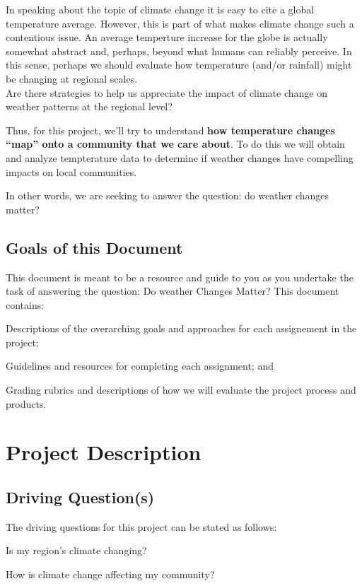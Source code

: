 \documentclass{article}\usepackage[]{graphicx}\usepackage[]{color}
\newenvironment{itemize*}%
  {\begin{itemize}%
    \setlength{\itemsep}{0pt}%
    \setlength{\parskip}{0pt}}%
  {\end{itemize}}
\newenvironment{enumerate*}%
  {\begin{enumerate}%
    \setlength{\itemsep}{0pt}%
    \setlength{\parskip}{0pt}}%
  {\end{enumerate}}
\begin{document}
In speaking about the topic of climate change it is easy to cite a global temperature average. However, this is part of what makes climate change such a contentious issue. An average temperture increase for the globe is actually somewhat abstract and, perhaps, beyond what humans can reliably perceive. In this sense, perhaps we should evaluate how temperature (and/or rainfall) might be changing at regional scales. \\ Are there strategies to help us appreciate the impact of climate change on weather patterns at the regional level? 

Thus, for this project, we'll try to understand \textbf{how temperature changes ``map'' onto a community that we care about}. To do this we will obtain and analyze tempterature data to determine if weather changes have compelling impacts on local communities.

In other words, we are seeking to answer the question: do weather changes matter?

\subsection{Goals of this Document}

This document is meant to be a resource and guide to you as you undertake the task of answering the question: Do weather Changes Matter? This document contains:

\begin{enumerate*}
  \item Descriptions of the overarching goals and approaches for each assignement in the project;
  \item Guidelines and resources for completing each assignment; and
  \item Grading rubrics and descriptions of how we will evaluate the project process and products.
\end{enumerate*}

\section{Project Description}

\subsection{Driving Question(s)}

The driving questions for this project can be stated as follows: 

\begin{itemize*}
  \item Is my region's climate changing?
  \item How is climate change affecting my community?
  
\end{itemize*}
\end{document}
